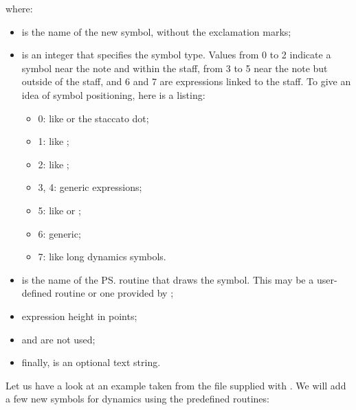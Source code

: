 \documentclass[a4paper,fullpage,12pt]{book}
\begin{document}
where:

\begin{itemize}
  
  \item {} is the name of the new symbol, without the
  exclamation marks;
  
  \item {} is an integer that specifies the symbol type.
  Values from 0 to 2 indicate a symbol near the note and within the
  staff, from 3 to 5 near the note but outside of the staff, and 6 and
  7 are expressions linked to the staff. To give an idea of symbol
  positioning, here is a listing:
  
  \begin{itemize}
  
    \item 0: like  or the staccato dot;
    
    \item 1: like ;
    
    \item 2: like ;
    
    \item 3, 4: generic expressions;
    
    \item 5: like  or ;
    
    \item 6: generic;
    
    \item 7: like long dynamics symbols.
    
  \end{itemize}

  \item {} is the name of the \ps{} routine that draws the
  symbol. This may be a user-defined routine or one provided by
  \abcm{};

  \item {} expression height in points;

  \item {} and  are not used;

  \item finally,  is an optional text string.

\end{itemize}

Let us have a look at an example taken from the file 
supplied with \abcm{}. We will add a few new symbols for dynamics
using the predefined  routines:
\end{document}
